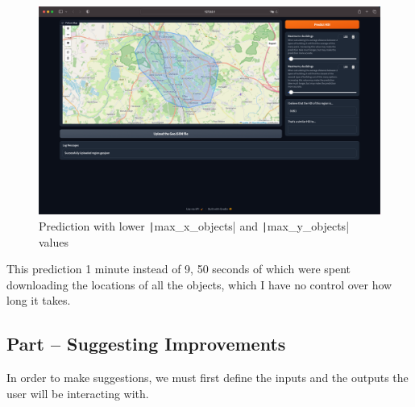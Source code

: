 \documentclass[12pt]{report}
\newcommand{\pil}[1]{\protect\texttt|#1|}
\begin{document}
\begin{figure}[H]
\centering
\includegraphics[width=14cm]{ss12.7.png}
\caption{Prediction with lower \pil{max_x_objects} and \pil{max_y_objects} values}\label{fig:ss12.7}
\end{figure}

\begin{center}
\end{center}

This prediction 1 minute instead of 9, 50 seconds of which were spent downloading the locations of all the objects, which I have no control over how long it takes.

\subsection{Part \theparts{} -- Suggesting Improvements}

In order to make suggestions, we must first define the inputs and the outputs the user will be interacting with.
\end{document}
